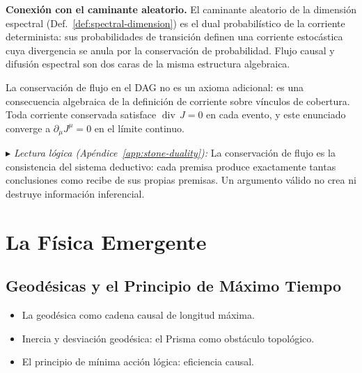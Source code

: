 \documentclass[11pt, a4paper, openany]{book}
\newcommand{\stoneref}[1]{%
  \smallskip\noindent
  {\small\color{structure!70}\textit{$\blacktriangleright$ Lectura
  l\'ogica (Ap\'endice~\ref{app:stone-duality}):} #1}%
  \smallskip}
\newenvironment{introduction}[1][Sinopsis del M\'odulo]{%
  \begin{tcolorbox}[
    enhanced,colback=structure!5,colframe=structure,
    colbacktitle=structure,coltitle=white,
    fonttitle=\small\bfseries,title={#1},
    arc=2pt,boxrule=0.7pt,
    left=8pt,right=8pt,top=6pt,bottom=6pt,
    before skip=12pt,after skip=12pt
  ]\itshape\begin{itemize}[leftmargin=*,itemsep=2pt,parsep=0pt]
}{%
  \end{itemize}\end{tcolorbox}
}
\begin{document}
\medskip\noindent\textbf{Conexi\'on con el caminante aleatorio.}\quad
El caminante aleatorio de la dimensi\'on espectral
(Def.~\ref{def:spectral-dimension}) es el dual probabil\'istico de la
corriente determinista: sus probabilidades de transici\'on definen una
corriente estoc\'astica cuya divergencia se anula por la conservaci\'on
de probabilidad. Flujo causal y difusi\'on espectral son dos caras de
la misma estructura algebraica.

\begin{result}[title={Conservaci\'on de Flujo}]
La conservaci\'on de flujo en el DAG no es un axioma adicional: es una
consecuencia algebraica de la definici\'on de corriente sobre v\'inculos
de cobertura. Toda corriente conservada satisface
$\operatorname{div}\,J = 0$ en cada evento, y este enunciado converge a
$\partial_\mu J^\mu = 0$ en el l\'imite continuo.
\end{result}

\stoneref{La conservaci\'on de flujo es la consistencia del sistema
deductivo: cada premisa produce exactamente tantas conclusiones como
recibe de sus propias premisas. Un argumento v\'alido no crea ni
destruye informaci\'on inferencial.}

\part{La F\'isica Emergente}

\chapter{Geod\'esicas y el Principio de M\'aximo Tiempo}

\begin{introduction}
  \item La geod\'esica como cadena causal de longitud m\'axima.
  \item Inercia y desviaci\'on geod\'esica: el Prisma como obst\'aculo
        topol\'ogico.
  \item El principio de m\'inima acci\'on l\'ogica: eficiencia causal.
\end{introduction}
\end{document}
